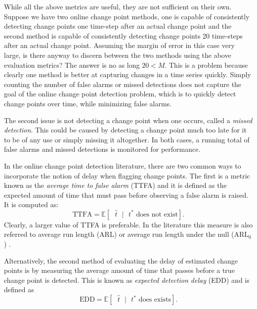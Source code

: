 While all the above metrics are useful, they are not sufficient on their own. Suppose we have two online change point methods, one is capable of consistently detecting change points one time-step after an actual change point and the second method is capable of consistently detecting change points 20 time-steps after an actual change point. Assuming the margin of error in this case very large, is there anyway to discern between the two methods using the above evaluation metrics?  The answer is no as long $20 < M$. This is a problem because clearly one method is better at capturing changes in a time series quickly. Simply counting the number of false alarms or missed detections does not capture the goal of the online change point detection problem, which is to quickly detect change points over time, while minimizing false alarms. 
 

The second issue is not detecting a change point when one occurs, called a \textit{missed detection}. This could be caused by detecting a change point much too late for it to be of any use or simply missing it altogether. 
In both cases, a running total of false alarms and missed detections is monitored for performance. 

In the online change point detection literature, there are two common ways to incorporate the notion of delay when flagging change points. The first is a metric known as the \textit{average time to false alarm} (TTFA) and it is defined as 
the expected amount of time that must pass before observing a false alarm is raised. It is computed as:
\begin{equation}
\label{ttfa}
\text{TTFA} = \mathbb{E}[\text{ }  \hat{t} \text{ } |\text{ }  t^* \text{ does not exist} ].
\end{equation}
Clearly, a larger value of TTFA is preferable. In the literature this measure is also referred to average run length (ARL) or average run length under the null (ARL$_0$) \cite{johnson2017detecting}. 

Alternatively, the second method of evaluating the delay of estimated change points is by measuring the average amount of time that passes before a true change point is detected. This is known as \textit{expected detection delay} (EDD) and is defined as 
\begin{equation}
\label{edd}
\text{EDD} = \mathbb{E}[\text{ }  \hat{t} \text{ } |\text{ }  t^* \text{ does exists} ].
\end{equation}

